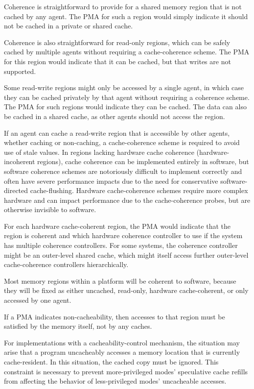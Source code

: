 \begin{commentary}
Coherence is straightforward to provide for a shared memory region
that is not cached by any agent.  The PMA for such a region would
simply indicate it should not be cached in a private or shared cache.

Coherence is also straightforward for read-only regions, which can be
safely cached by multiple agents without requiring a cache-coherence
scheme.  The PMA for this region would indicate that it can be cached,
but that writes are not supported.

Some read-write regions might only be accessed by a single agent, in
which case they can be cached privately by that agent without
requiring a coherence scheme.  The PMA for such regions would indicate
they can be cached.  The data can also be cached in a shared cache, as
other agents should not access the region.

If an agent can cache a read-write region that is accessible by other
agents, whether caching or non-caching, a cache-coherence scheme is
required to avoid use of stale values.  In regions lacking hardware
cache coherence (hardware-incoherent regions), cache coherence can be
implemented entirely in software, but software coherence schemes are
notoriously difficult to implement correctly and often have severe
performance impacts due to the need for conservative software-directed
cache-flushing.  Hardware cache-coherence schemes require more complex
hardware and can impact performance due to the cache-coherence probes,
but are otherwise invisible to software.

For each hardware cache-coherent region, the PMA would indicate that
the region is coherent and which hardware coherence controller to use
if the system has multiple coherence controllers.  For some systems,
the coherence controller might be an outer-level shared cache, which
might itself access further outer-level cache-coherence controllers
hierarchically.

Most memory regions within a platform will be coherent to software,
because they will be fixed as either uncached, read-only, hardware
cache-coherent, or only accessed by one agent.
\end{commentary}

If a PMA indicates non-cacheability, then accesses to that region must
be satisfied by the memory itself, not by any caches.

\begin{commentary}
For implementations with a cacheability-control mechanism, the situation
may arise that a program uncacheably accesses a memory location that is
currently cache-resident.
In this situation, the cached copy must be ignored.
This constraint is necessary to prevent more-privileged modes' speculative
cache refills from affecting the behavior of less-privileged modes'
uncacheable accesses.
\end{commentary}

